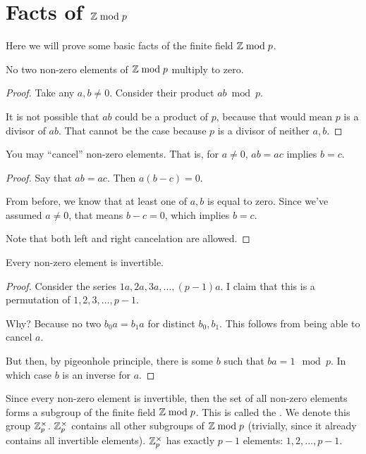 \section{Facts of $\mathbb{Z} \bmod p$}

Here we will prove some basic facts of the finite field $\mathbb{Z} \bmod p$.

\begin{lemma}
  No two non-zero elements of $\mathbb{Z} \bmod p$ multiply to zero.
\end{lemma}

\begin{proof}
  Take any $a, b \ne 0$. Consider their product $ab \bmod p$.

  It is not possible that $ab$ could be a product of $p$, because that
  would mean $p$ is a divisor of $ab$. That cannot be the case because
  $p$ is a divisor of neither $a, b$.
\end{proof}

\begin{lemma}
  You may ``cancel'' non-zero elements. That is, for $a \ne 0$, $ab =
  ac$ implies $b = c$.
\end{lemma}

\begin{proof}
  Say that $ab = ac$. Then $a (b - c) = 0$.

  From before, we know that at least one of $a, b$ is equal to zero.
  Since we've assumed $a \ne 0$, that means $b - c = 0$, which implies
  $b = c$.

  Note that both left and right cancelation are allowed.
\end{proof}

\begin{lemma}
  Every non-zero element is invertible.
\end{lemma}

\begin{proof}
  Consider the series $1a, 2a, 3a, \ldots, (p - 1)a$. I claim that this
  is a permutation of $1, 2, 3, \ldots, p - 1$.

  Why? Because no two $b_0 a = b_1 a$ for distinct $b_0, b_1$. This
  follows from being able to cancel $a$.

  But then, by pigeonhole principle, there is some $b$ such that $ba =
  1 \mod p$. In which case $b$ is an inverse for $a$.
\end{proof}

\begin{definition}
  Since every non-zero element is invertible, then the set of all
  non-zero elements forms a subgroup of the finite field $\mathbb{Z} \bmod p$. This
  is called the . We denote this group
  $\mathbb{Z}_p^\times$. $\mathbb{Z}_p^\times$ contains all other subgroups of $\mathbb{Z} \bmod p$
  (trivially, since it already contains all invertible elements).
  $\mathbb{Z}_p^\times$ has exactly $p - 1$ elements: $1, 2, ..., p - 1$.
\end{definition}

